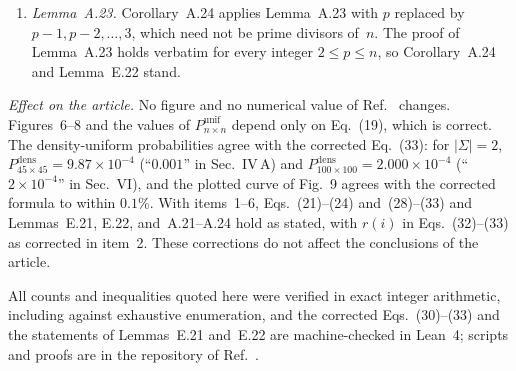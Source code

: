 \documentclass[10pt,twocolumn,letterpaper]{article}
\newcommand{\onlinecite}[1]{\citen{#1}}
\newcommand{\sig}{|\Sigma|}
\newtheorem{lemma}{Lemma}
\newenvironment{proofR}{\par\noindent\textit{Proof.}\ }{\hfill$\square$\par\medskip}
\begin{document}
\begin{enumerate}[leftmargin=*,label=\arabic*.,itemsep=0.5ex]
\begin{proofR}
As $p_1\cdots p_m\ge2$ divides $n/p$, we have $p\le n/2$ and $A\ge2n$. By
\eqref{eq:sandwich} with $c=p^{-1}$, and since
$p\sig^{A/p}\le(p{+}1)\sig^{A/2}$,
\[
  y_1+x_1+y_2\ge(p{+}1)\,\sig^{A/2}\Bigl(\sig^{A/2}-\frac{2n}{p}-1\Bigr)\ge0,
\]
because $\sig^{A/2}\ge2^n\ge n+1\ge2n/p+1$.
\end{proofR}

\begin{lemma}[replaces the chain for A.22]\label{lem:r3}
In the same setting, $x_1+x_2+y_2\le y_1$; hence
$q^{m+1}_{n\times n}\le q^m_{n\times n}+2(p{+}1)\sig^{n^2/p}$, the
recursion of the proof of Lemma~A.22.
\end{lemma}

\begin{proofR}
By \eqref{eq:sandwich}, $x_1\le0$, and $y_2\le0$. By \eqref{eq:sandwich}
with $c=p^{-2}$, $x_2\le2n\sig^{n^2/(2p^2)}$. Since
$n^2/p-n^2/(2p^2)\ge\tfrac34A\ge\tfrac32n$ and $2n\le2^{3n/2}$, this gives
$x_2\le(p{+}1)\sig^{n^2/p}=y_1$.
\end{proofR}

\item \emph{Lemma~A.23.} Corollary~A.24 applies Lemma~A.23 with $p$
replaced by $p-1,p-2,\dots,3$, which need not be prime divisors of~$n$. The
proof of Lemma~A.23 holds verbatim for every integer $2\le p\le n$, so
Corollary~A.24 and Lemma~E.22 stand.

\end{enumerate}

\noindent\emph{Effect on the article.} No figure and no numerical value of
Ref.~\onlinecite{banda2019} changes. Figures~6--8 and the values of
$P^{\mathrm{unif}}_{n\times n}$ depend only on Eq.~(19), which is correct.
The density-uniform probabilities agree with the corrected Eq.~(33): for
$\sig=2$, $P^{\mathrm{dens}}_{45\times45}=9.87\times10^{-4}$ (``$0.001$'' in
Sec.~IV\,A) and $P^{\mathrm{dens}}_{100\times100}=2.000\times10^{-4}$
(``$2\times10^{-4}$'' in Sec.~VI), and the plotted curve of Fig.~9 agrees
with the corrected formula to within $0.1\%$. With items~1--6,
Eqs.~(21)--(24) and~(28)--(33) and Lemmas~E.21, E.22, and~A.21--A.24 hold
as stated, with $r(i)$ in Eqs.~(32)--(33) as corrected in item~2. These
corrections do not affect the conclusions of the article.

All counts and inequalities quoted here were verified in exact integer
arithmetic, including against exhaustive enumeration, and the corrected
Eqs.~(30)--(33) and the statements of Lemmas~E.21 and~E.22 are
machine-checked in Lean~4; scripts and proofs are in the repository of
Ref.~\onlinecite{banda2026}.
\end{document}
